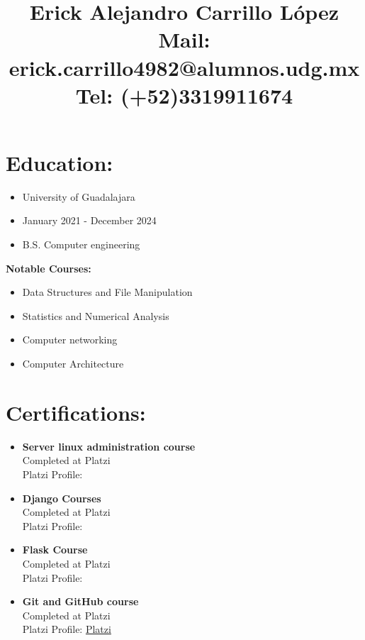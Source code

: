 \documentclass{article}
\title{\textbf{Erick Alejandro Carrillo López} \\
\textbf{Mail:} erick.carrillo4982@alumnos.udg.mx\\
\textbf{Tel:} (+52)3319911674
}
\date{}
\begin{document}
\maketitle

\begin{minipage}[t]{8cm}
\vspace*{-2cm}
\section*{Education:}
\begin{itemize}
  \setlength\itemsep{0.01cm}
\item University of Guadalajara
\item January 2021 - December 2024
\item B.S. Computer engineering
\end{itemize}
\textbf{Notable Courses:}
\begin{itemize}
  \setlength\itemsep{0.01cm}
\item Data Structures and File Manipulation
\item Statistics and Numerical Analysis
\item Computer networking
\item Computer Architecture
\end{itemize}

\section*{Certifications:}
\begin{itemize}
  \setlength\itemsep{0.01cm}
\item \textbf{Server linux administration course}\\
  Completed at Platzi\\
  Platzi Profile: \href{https://platzi.com/p/windowsky/}{\color{Blue}{Platzi}}
\item \textbf{Django Courses}\\
  Completed at Platzi\\
  Platzi Profile: \href{https://platzi.com/p/windowsky/}{\color{Blue}{Platzi}}
\item \textbf{Flask Course}\\
  Completed at Platzi\\
  Platzi Profile: \href{https://platzi.com/p/windowsky/}{\color{Blue}{Platzi}}
\item \textbf{Git and GitHub course}\\
  Completed at Platzi\\
  Platzi Profile: \href{https://platzi.com/p/windowsky/}{Platzi}
  

\end{itemize}
\end{minipage}
\end{document}
